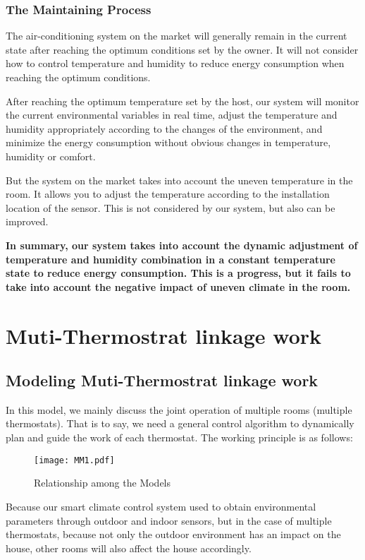 \documentclass{mcmthesis}
\begin{document}
			\subsubsection{The Maintaining Process}
				The air-conditioning system on the market will generally remain in the current state after reaching the optimum conditions set by the owner. It will not consider how to control temperature and humidity to reduce energy consumption when reaching the optimum conditions.
				
				After reaching the optimum temperature set by the host, our system will monitor the current environmental variables in real time, adjust the temperature and humidity appropriately according to the changes of the environment, and minimize the energy consumption without obvious changes in temperature, humidity or comfort.
				
				But the system on the market takes into account the uneven temperature in the room. It allows you to adjust the temperature according to the installation location of the sensor. This is not considered by our system, but also can be improved.
				
				\textbf{In summary, our system takes into account the dynamic adjustment of temperature and humidity combination in a constant temperature state to reduce energy consumption. This is a progress, but it fails to take into account the negative impact of uneven climate in the room.}
	
	\section{Muti-Thermostrat linkage work}
	
		\subsection{Modeling Muti-Thermostrat linkage work}
			In this model, we mainly discuss the joint operation of multiple rooms (multiple thermostats).	That is to say, we need a general control algorithm to dynamically plan and guide the work of each thermostat. The working principle is as follows:
			
			\begin{figure}[h]
				\small
				\centering
				\texttt{[image: MM1.pdf]}
				\caption{Relationship among the Models} \label{fig:process2}
			\end{figure}
			
			Because our smart climate control system used to obtain environmental parameters through outdoor and indoor sensors, but in the case of multiple thermostats, because not only the outdoor environment has an impact on the house, other rooms will also affect the house accordingly.
			
\end{document}
